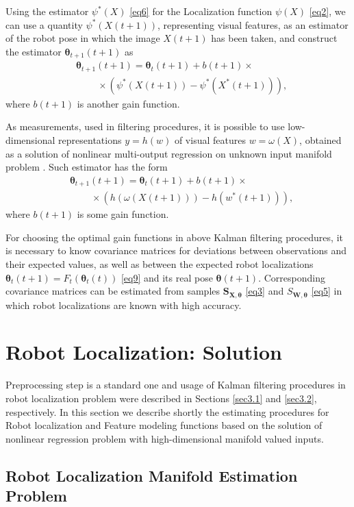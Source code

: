 \documentclass[conference]{IEEEtran} %
\def\mbtheta{{\bm\theta}}
\def\mbS{\mathbf{S}}
\begin{document}
Using the estimator $\psi^*(X)$ \eqref{eq6} for the Localization function $\psi(X)$ \eqref{eq2}, we can use a quantity $\psi^*(X(t+1))$, representing visual features, as an estimator of the robot pose in which the image $X(t+1)$ has been taken, and construct the estimator $\mbtheta_{t+1}(t+1)$ as
\begin{eqnarray*}
	&\mbtheta_{t+1}(t+1) = \mbtheta_t(t+1) + b(t+1)\times \\ & \;\;\;\;\;\;\;\;
    \times(\psi^*(X(t+1)) - \psi^*(X^*(t+1))),
\end{eqnarray*}
where $b(t+1)$ is another gain function.

As measurements, used in filtering procedures, it is possible to use low-dimensional representations $y = h(w)$ of visual features $w = \omega(X)$, obtained as a solution of nonlinear multi-output regression on unknown input manifold problem \cite{bib20}. Such estimator has the form
\begin{eqnarray*}
	& \mbtheta_{t+1}(t+1) = \mbtheta_t(t+1) + b(t+1)\times\\
     & \;\;\;\;\;\;\;\; \times(h(\omega(X(t+1))) - h(w^*(t+1))),
\end{eqnarray*}
where $b(t+1)$ is some gain function.

For choosing the optimal gain functions in above Kalman filtering procedures, it is necessary to know covariance matrices for deviations between observations and their expected values, as well as between the expected robot localizations $\mbtheta_t(t+1) = F_t(\mbtheta_t(t))$ \eqref{eq9} and its real pose $\mbtheta(t+1)$. Corresponding covariance matrices can be estimated from samples $\mbS_{\mathbf{X},\mbtheta}$ \eqref{eq3} and $S_{\mathbf{W},\mbtheta}$ \eqref{eq5} in which robot localizations are known with high accuracy.

\section{Robot Localization: Solution}
\label{sec4}

Preprocessing step is a standard one and usage of Kalman filtering procedures in robot localization problem were described in Sections \ref{sec3.1} and \ref{sec3.2}, respectively. In this section we describe shortly the estimating procedures for Robot localization and Feature modeling functions based on the solution of nonlinear regression problem with high-dimensional manifold valued inputs.

\subsection{Robot Localization Manifold Estimation Problem}
\end{document}

